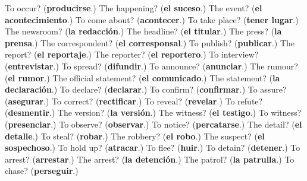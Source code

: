 \begin{tcolorbox}[breakable,colback=teal!4,colframe=teal!35!black,title={Before you move on}]
To occur? (\textbf{producirse}.) The happening? (\textbf{el suceso}.) The event? (\textbf{el acontecimiento}.) To come about? (\textbf{acontecer}.) To take place? (\textbf{tener lugar}.) The newsroom? (\textbf{la redacción}.) The headline? (\textbf{el titular}.) The press? (\textbf{la prensa}.) The correspondent? (\textbf{el corresponsal}.) To publish? (\textbf{publicar}.) The report? (\textbf{el reportaje}.) The reporter? (\textbf{el reportero}.) To interview? (\textbf{entrevistar}.) To spread? (\textbf{difundir}.) To announce? (\textbf{anunciar}.) The rumour? (\textbf{el rumor}.) The official statement? (\textbf{el comunicado}.) The statement? (\textbf{la declaración}.) To declare? (\textbf{declarar}.) To confirm? (\textbf{confirmar}.) To assure? (\textbf{asegurar}.) To correct? (\textbf{rectificar}.) To reveal? (\textbf{revelar}.) To refute? (\textbf{desmentir}.) The version? (\textbf{la versión}.) The witness? (\textbf{el testigo}.) To witness? (\textbf{presenciar}.) To observe? (\textbf{observar}.) To notice? (\textbf{percatarse}.) The detail? (\textbf{el detalle}.) To steal? (\textbf{robar}.) The robbery? (\textbf{el robo}.) The suspect? (\textbf{el sospechoso}.) To hold up? (\textbf{atracar}.) To flee? (\textbf{huir}.) To detain? (\textbf{detener}.) To arrest? (\textbf{arrestar}.) The arrest? (\textbf{la detención}.) The patrol? (\textbf{la patrulla}.) To chase? (\textbf{perseguir}.)
\end{tcolorbox}
